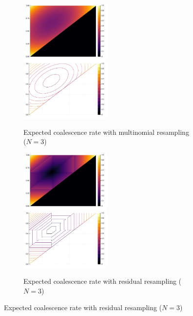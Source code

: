 \documentclass[fleqn]{article}
\theoremstyle{definition}
\begin{document}
\begin{figure}
	\centering
	\begin{subfigure}{\textwidth}
		\includegraphics[width=0.5\textwidth]{plots/EcN_mn_N3_heatmap.pdf}
		\includegraphics[width=0.5\textwidth]{plots/EcN_mn_N3_contour.pdf}
	\caption{Expected coalescence rate with multinomial resampling ($N=3$)}
	\end{subfigure}
	\begin{subfigure}{\textwidth}
		\includegraphics[width=0.5\textwidth]{plots/EcN_res_N3_heatmap.pdf}
		\includegraphics[width=0.5\textwidth]{plots/EcN_res_N3_contour.pdf}
	\caption{Expected coalescence rate with residual resampling ($N=3$)}
	\end{subfigure}
\end{figure}
\end{document}
